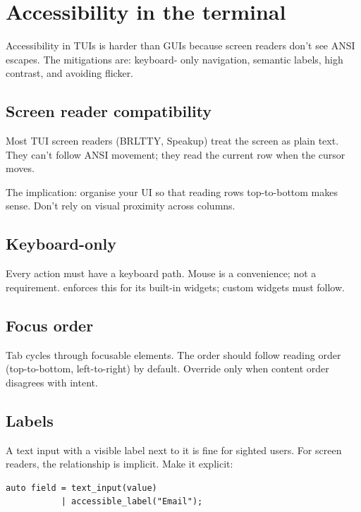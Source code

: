 \chapter{Accessibility in the terminal}
\label{ch:a11y2}

\begin{aside}
Accessibility in TUIs is harder than GUIs because screen
readers don't see ANSI escapes. The mitigations are: keyboard-
only navigation, semantic labels, high contrast, and avoiding
flicker.
\end{aside}

\section{Screen reader compatibility}

Most TUI screen readers (BRLTTY, Speakup) treat the screen
as plain text. They can't follow ANSI movement; they read
the current row when the cursor moves.

The implication: organise your UI so that reading rows
top-to-bottom makes sense. Don't rely on visual proximity
across columns.

\section{Keyboard-only}

Every action must have a keyboard path. Mouse is a
convenience; not a requirement. \maya{} enforces this for
its built-in widgets; custom widgets must follow.

\section{Focus order}

Tab cycles through focusable elements. The order should
follow reading order (top-to-bottom, left-to-right) by
default. Override only when content order disagrees with
intent.

\section{Labels}

A text input with a visible label next to it is fine for
sighted users. For screen readers, the relationship is
implicit. Make it explicit:

\begin{lstlisting}
auto field = text_input(value)
           | accessible_label("Email");
\end{lstlisting}

